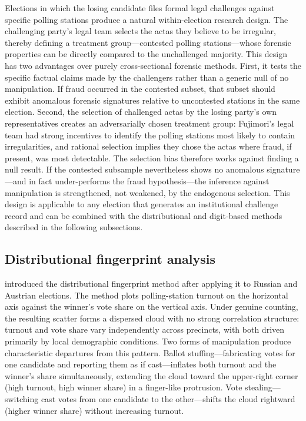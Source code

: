 \documentclass[12pt]{article}
\begin{document}
Elections in which the losing candidate files formal legal challenges against
specific polling stations produce a natural within-election research design.
The challenging party's legal team selects the actas they believe to be
irregular, thereby defining a treatment group---contested polling
stations---whose forensic properties can be directly compared to the
unchallenged majority. This design has two advantages over purely
cross-sectional forensic methods. First, it tests the specific factual claims
made by the challengers rather than a generic null of no manipulation. If
fraud occurred in the contested subset, that subset should exhibit anomalous
forensic signatures relative to uncontested stations in the same election.
Second, the selection of challenged actas by the losing party's own
representatives creates an adversarially chosen treatment group: Fujimori's
legal team had strong incentives to identify the polling stations most likely
to contain irregularities, and rational selection implies they chose the
actas where fraud, if present, was most detectable. The selection bias
therefore works against finding a null result. If the contested subsample
nevertheless shows no anomalous signature---and in fact under-performs the
fraud hypothesis---the inference against manipulation is strengthened, not
weakened, by the endogenous selection. This design is applicable to any
election that generates an institutional challenge record and can be combined
with the distributional and digit-based methods described in the following
subsections.

\subsection{Distributional fingerprint analysis}

\citet{klimek2012} introduced the distributional fingerprint method after
applying it to Russian and Austrian elections. The method plots polling-station
turnout on the horizontal axis against the winner's vote share on the vertical
axis. Under genuine counting, the resulting scatter forms a dispersed cloud
with no strong correlation structure: turnout and vote share vary
independently across precincts, with both driven primarily by local demographic
conditions. Two forms of manipulation produce characteristic departures from
this pattern. Ballot stuffing---fabricating votes for one candidate and
reporting them as if cast---inflates both turnout and the winner's share
simultaneously, extending the cloud toward the upper-right corner
(high turnout, high winner share) in a finger-like protrusion. Vote
stealing---switching cast votes from one candidate to the other---shifts the
cloud rightward (higher winner share) without increasing turnout.
\end{document}
